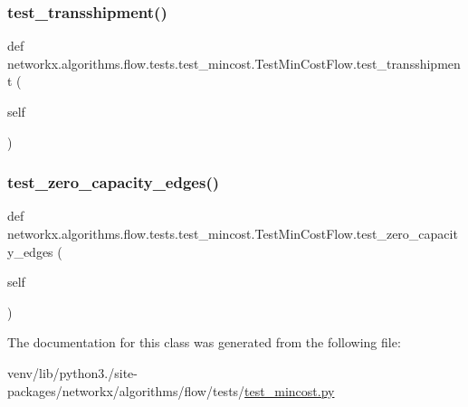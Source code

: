\subsubsection{\texorpdfstring{test\+\_\+transshipment()}{test\_transshipment()}}
{\footnotesize\ttfamily def networkx.\+algorithms.\+flow.\+tests.\+test\+\_\+mincost.\+Test\+Min\+Cost\+Flow.\+test\+\_\+transshipment (\begin{DoxyParamCaption}\item[{}]{self }\end{DoxyParamCaption})}

\mbox{\label{classnetworkx_1_1algorithms_1_1flow_1_1tests_1_1test__mincost_1_1TestMinCostFlow_ac658db30c7effd7316c5394ee6b1484e}} 
\subsubsection{\texorpdfstring{test\+\_\+zero\+\_\+capacity\+\_\+edges()}{test\_zero\_capacity\_edges()}}
{\footnotesize\ttfamily def networkx.\+algorithms.\+flow.\+tests.\+test\+\_\+mincost.\+Test\+Min\+Cost\+Flow.\+test\+\_\+zero\+\_\+capacity\+\_\+edges (\begin{DoxyParamCaption}\item[{}]{self }\end{DoxyParamCaption})}

 

The documentation for this class was generated from the following file\+:\begin{DoxyCompactItemize}
\item 
venv/lib/python3./site-\/packages/networkx/algorithms/flow/tests/\hyperlink{test__mincost_8py}{test\+\_\+mincost.\+py}\end{DoxyCompactItemize}
